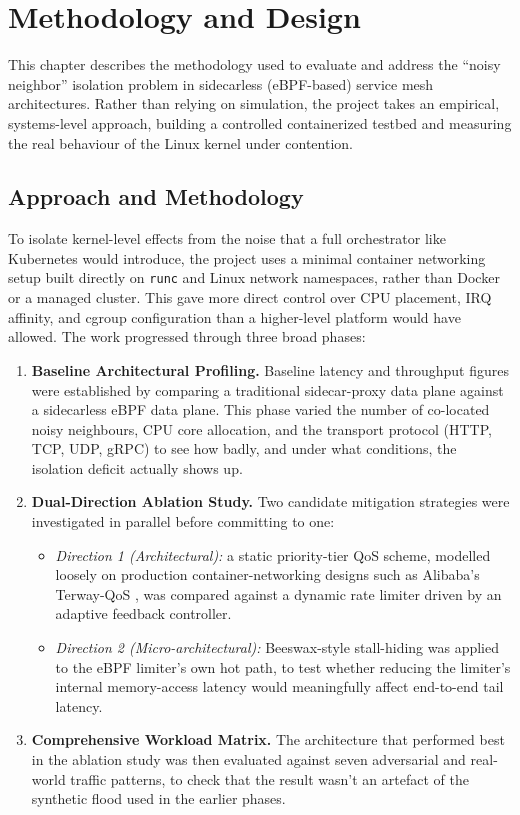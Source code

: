 
\section{Methodology and Design}

This chapter describes the methodology used to evaluate and address the
``noisy neighbor'' isolation problem in sidecarless (eBPF-based) service
mesh architectures. Rather than relying on simulation, the project takes an
empirical, systems-level approach, building a controlled containerized
testbed and measuring the real behaviour of the Linux kernel under
contention.

\subsection{Approach and Methodology}
To isolate kernel-level effects from the noise that a full orchestrator
like Kubernetes would introduce, the project uses a minimal container
networking setup built directly on \texttt{runc} and Linux network
namespaces, rather than Docker or a managed cluster. This gave more direct
control over CPU placement, IRQ affinity, and cgroup configuration than a
higher-level platform would have allowed. The work progressed through three
broad phases:

\begin{enumerate}
    \item \textbf{Baseline Architectural Profiling.} Baseline latency and
    throughput figures were established by comparing a traditional
    sidecar-proxy data plane against a sidecarless eBPF data plane. This
    phase varied the number of co-located noisy neighbours, CPU core
    allocation, and the transport protocol (HTTP, TCP, UDP, gRPC) to see
    how badly, and under what conditions, the isolation deficit actually
    shows up.
    \item \textbf{Dual-Direction Ablation Study.} Two candidate mitigation
    strategies were investigated in parallel before committing to one:
    \begin{itemize}
        \item \textit{Direction 1 (Architectural):} a static priority-tier
        QoS scheme, modelled loosely on production container-networking
        designs such as Alibaba's Terway-QoS \cite{aliyun2024terway}, was
        compared against a dynamic rate limiter driven by an adaptive
        feedback controller.
        \item \textit{Direction 2 (Micro-architectural):} Beeswax-style
        stall-hiding \cite{shahinfar2026dont} was applied to the eBPF
        limiter's own hot path, to test whether reducing the limiter's
        internal memory-access latency would meaningfully affect
        end-to-end tail latency.
    \end{itemize}
    \item \textbf{Comprehensive Workload Matrix.} The architecture that
    performed best in the ablation study was then evaluated against seven
    adversarial and real-world traffic patterns, to check that the result
    wasn't an artefact of the synthetic flood used in the earlier phases.
\end{enumerate}

